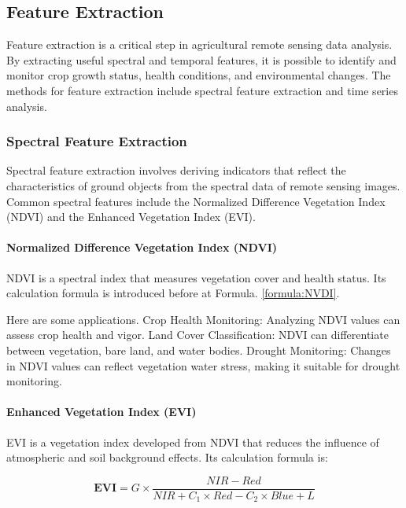 \subsection{Feature Extraction}

Feature extraction is a critical step in agricultural remote sensing data analysis. By extracting useful spectral and temporal features, it is possible to identify and monitor crop growth status, health conditions, and environmental changes\cite{mullaTwentyFiveYears2013}. The methods for feature extraction include spectral feature extraction and time series analysis.

\subsubsection{Spectral Feature Extraction}

Spectral feature extraction involves deriving indicators that reflect the characteristics of ground objects from the spectral data of remote sensing images. Common spectral features include the Normalized Difference Vegetation Index (NDVI) and the Enhanced Vegetation Index (EVI).

\paragraph{Normalized Difference Vegetation Index (NDVI)}

NDVI is a spectral index that measures vegetation cover and health status. Its calculation formula is introduced before at Formula. \ref{formula:NVDI}.

Here are some applications.
Crop Health Monitoring: Analyzing NDVI values can assess crop health and vigor.
Land Cover Classification: NDVI can differentiate between vegetation, bare land, and water bodies.
Drought Monitoring: Changes in NDVI values can reflect vegetation water stress, making it suitable for drought monitoring.

\paragraph{Enhanced Vegetation Index (EVI)}

EVI\cite{Enhanced25:online} is a vegetation index developed from NDVI that reduces the influence of atmospheric and soil background effects. Its calculation formula is:

\begin{equation}
    \textbf{EVI} = G \times \frac{NIR - Red}{NIR + C_1 \times Red - C_2 \times Blue + L}
\end{equation}

